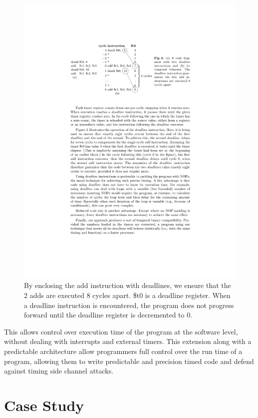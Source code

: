 \documentclass[times, 10pt,twocolumn]{article}
\begin{document}
\begin{figure}
  \centering
  \includegraphics[scale=.85]{./images/deadlineExp.pdf}
  \caption{By enclosing the add instruction with deadlines, we ensure that the 2 adds are executed 8 cycles apart. \$t0 is a deadline register. When a deadline instruction is encountered, the program does not progress forward until the deadline register is decremented to 0.}
  \label{fig:deadline}
\end{figure}

This allows control over execution time of the program at the software level, without dealing with interrupts and external timers. This extension along with a predictable architecture allow programmers full control over the run time of a program, allowing them to write predictable and precision timed code and defend against timing side channel attacks. 

\section{Case Study}
\end{document}
